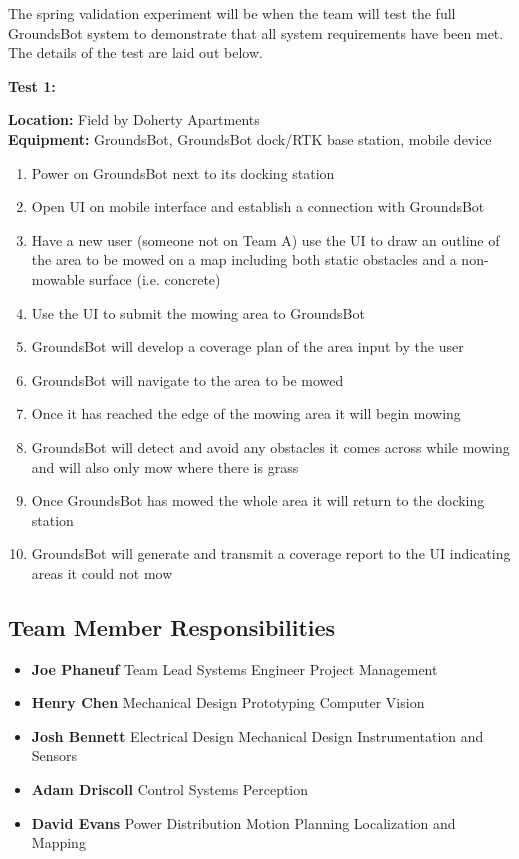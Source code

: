 \documentclass[12pt]{extarticle}
\begin{document}
	The spring validation experiment will be when the team will test the full GroundsBot system to demonstrate that all system requirements have been met. The details of the test are laid out below.
\begin{center}
 \textbf{Test 1: }
\end{center}
 \textbf{Location:} Field by Doherty Apartments \\
 \textbf{Equipment:} GroundsBot, GroundsBot dock/RTK base station, mobile device \\
\begin{enumerate}
  \item Power on GroundsBot next to its docking station
  \item Open UI on mobile interface and establish a connection with GroundsBot
  \item Have a new user (someone not on Team A) use the UI to draw an outline of the area to be mowed on a map including both static obstacles and a non-mowable surface (i.e. concrete)
  \item Use the UI to submit the mowing area to GroundsBot
  \item GroundsBot will develop a coverage plan of the area input by the user
  \item GroundsBot will navigate to the area to be mowed
  \item Once it has reached the edge of the mowing area it will begin mowing
  \item GroundsBot will detect and avoid any obstacles it comes across while mowing and will also only mow where there is grass
  \item Once GroundsBot has mowed the whole area it will return to the docking station
  \item GroundsBot will generate and transmit a coverage report to the UI indicating areas it could not mow
\end{enumerate}

\subsection{Team Member Responsibilities}
\begin{itemize}
  \item [] \textbf{Joe Phaneuf}
    \subitem  Team Lead
    \subitem  Systems Engineer
    \subitem  Project Management
  \item [] \textbf{Henry Chen}
    \subitem  Mechanical Design
    \subitem  Prototyping
    \subitem  Computer Vision
  \item [] \textbf{Josh Bennett}
    \subitem  Electrical Design
    \subitem  Mechanical Design
    \subitem  Instrumentation and Sensors
  \item [] \textbf{Adam Driscoll}
    \subitem  Control Systems
    \subitem  Perception
  \item [] \textbf{David Evans}
    \subitem  Power Distribution
    \subitem  Motion Planning
    \subitem  Localization and Mapping
\end{itemize}
\end{document}
